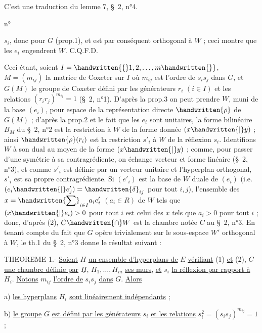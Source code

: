 C'est une traduction du lemme 7, \S\ 2, n°4.
\begin{flushright}n° \end{flushright}
$s_i$, donc pour $G$ (prop.1), et est par conséquent orthogonal à $W$ ; ceci montre que les $e_i$ engendrent $W$. C.Q.F.D.

Ceci étant, soient $I=\handwritten{\{}1,2,\ldots,m\handwritten{\}}$, $M=(m_{ij})$ la matrice de Coxeter sur $I$ où $m_{ij}$ est l'ordre de $s_i s_j$ dans $G$, et $G(M)$ le groupe de Coxeter défini par les générateurs $r_i$ $(i\in I)$ et les relations $(r_i r_j)^{m_{ij}}=1$ (\S\ 2, n°1). D'après la prop.3 on peut prendre $W$, muni de la base $(e_i)$, pour espace de la représentation directe $\handwritten{\rho}$ de $G(M)$ ; d'après la prop.2 et le fait que les $e_i$ sont unitaires, la forme bilinéaire $B_M$ du \S\ 2, n°2 est la restriction à $W$ de la forme donnée $(x\handwritten{|}y)$ ; ainsi $\handwritten{\rho}(r_i)$ est la restriction $s'_i$ à $W$ de la réflexion $s_i$. Identifions $W$ à son dual au moyen de la forme $(x\handwritten{|}y)$ ; comme, pour passer d'une symétrie à sa contragrédiente, on échange vecteur et forme linéaire (\S\ 2, n°3), et comme $s'_i$ est définie par un vecteur unitaire et l'hyperplan orthogonal, $s'_i$ est sa propre contragrédiente. Si $(e'_i)$ est la base de $W$ duale de $(e_i)$ (i.e. $(e_i\handwritten{|}e'_j)=\handwritten{\delta}_{ij}$ pour tout $i,j$), l'ensemble des $\displaystyle x=\handwritten{\sum}_{i\in I}a_i e'_i$ $(a_i\in R)$ de $W$ tels que $(x\handwritten{|}e_i)>0$ pour tout $i$ est celui des $x$ tels que $a_i>0$ pour tout $i$ ; donc, d'après (2), $C\handwritten{\cap}W$ est la chambre notée $C$ au \S\ 2, n°3. En tenant compte du fait que $G$ opère trivialement sur le sous-espace $W'$ orthogonal à $W$, le th.1 du \S\ 2, n°3 donne le résultat suivant :

THEOREME 1.- \uline{Soient} $\underline{H}$ \uline{un ensemble d'hyperplans de} $E$ \uline{vérifiant} (1) \uline{et} (2), $C$ \uline{une chambre définie par} $\underline{H}$, $H_1,\ldots,H_m$ \uline{ses murs}, \uline{et} $s_i$ \uline{la réflexion par rapport à} $H_i$. \uline{Notons} $m_{ij}$ \uline{l'ordre de} $s_i s_j$ \uline{dans} $G$. \uline{Alors}

a) \uline{les hyperplans} $H_i$ \uline{sont linéairement indépendants} ;

b) \uline{le groupe} $G$ \uline{est défini par les générateurs} $s_i$ \uline{et les relations} $s_i^2=(s_i s_j)^{m_{ij}}=1$;

